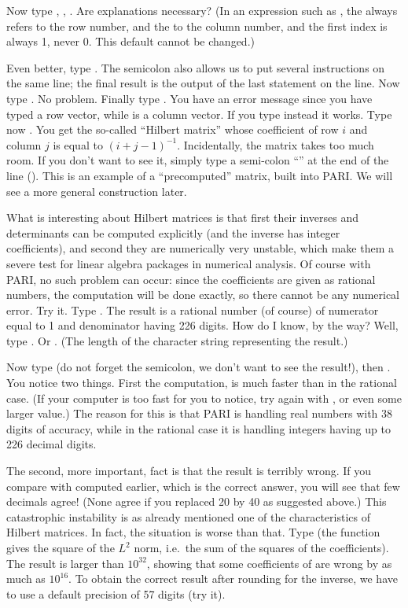 Now type , , . Are explanations necessary?
(In an expression such as , the  always refers to the
row number, and the  to the column number, and the first index is
always 1, never 0. This default cannot be changed.)

Even better, type . The semicolon also allows us to put
several instructions on the same line; the final result is the output of
the last statement on the line. Now type . No
problem. Finally type . You have an error message since you
have typed a row vector, while  is a column vector. If you type
instead  it works. \smallskip
%
\label{se:types}
Type now . You get the so-called ``Hilbert matrix''
whose coefficient of row $i$ and column $j$ is equal to $(i+j-1)^{-1}$.
Incidentally, the matrix  takes too much room. If you don't want to
see it, simply type a semi-colon ``\kbd{;}'' at the end of the line
(). This is an example of a ``precomputed'' matrix,
built into PARI. We will see a more general construction later.

What is interesting about Hilbert matrices is that first their inverses and
determinants can be computed explicitly (and the inverse has integer
coefficients), and second they are numerically very unstable, which make them
a severe test for linear algebra packages in numerical analysis.  Of course
with PARI, no such problem can occur: since the coefficients are given as
rational numbers, the computation will be done exactly, so there cannot be
any numerical error. Try it. Type . The result is a
rational number (of course) of numerator equal to 1 and denominator having
226 digits. How do I know, by the way? Well, type . Or
. (The length of the character string representing the
result.)

Now type  (do not forget the semicolon, we don't want to see
the result!), then . You notice two things. First the
computation, is much faster than in the rational case. (If your computer is
too fast for you to notice, try again with , or
even some larger value.) The reason for this is that PARI is handling real
numbers with 38 digits of accuracy, while in the rational case it is
handling integers having up to 226 decimal digits.

The second, more important, fact is that the result is terribly wrong. If you
compare with  computed earlier, which is the correct answer, you
will see that few decimals agree! (None agree if you replaced 20 by 40 as
suggested above.) This catastrophic instability is as already mentioned one
of the characteristics of Hilbert matrices. In fact, the situation is
worse than that. Type  (the function 
gives the square of the $L^2$ norm, i.e.~the sum of the squares of the
coefficients). The result is larger than $10^{32}$, showing that some
coefficients of  are wrong by as much as $10^{16}$. To obtain the
correct result after rounding for the inverse, we have to use a default
precision of 57 digits (try it).

